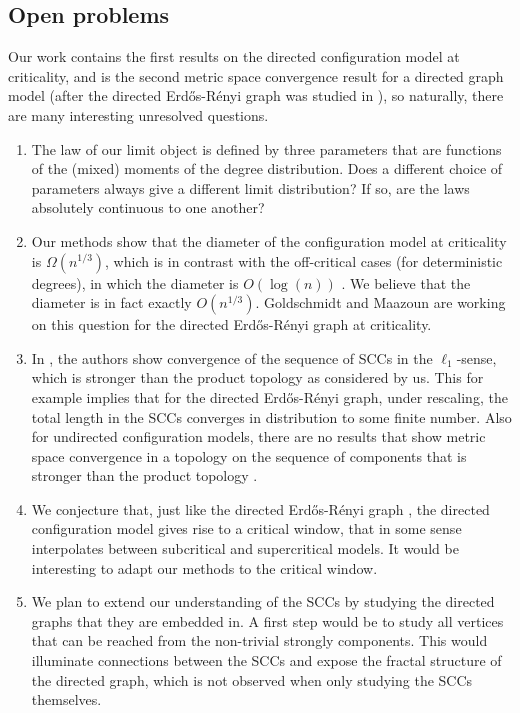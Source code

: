 \subsection{Open problems}\label{subsec.openproblems}
Our work contains the first results on the directed configuration model at criticality, and is the second metric space convergence result for a directed graph model (after the directed Erd\H{o}s-Rényi graph was studied in \cite{goldschmidtScalingLimitCritical2019}), so naturally, there are many interesting unresolved questions.
\begin{enumerate}
    \item The law of our limit object is defined by three parameters that are functions of the (mixed) moments of the degree distribution. Does a different choice of parameters always give a different limit distribution? If so, are the laws absolutely continuous to one another?
    \item Our methods show that the diameter of the configuration model at criticality is  $\Omega(n^{1/3})$, which is in contrast with the off-critical cases (for deterministic degrees), in which the diameter is $O(\log(n))$ \cite{caiDiameterDirectedConfiguration2020}. We believe that the diameter is in fact exactly $O(n^{1/3})$. Goldschmidt and Maazoun are working on this question for the directed Erd\H{o}s-Rényi graph at criticality. 
    \item In \cite{goldschmidtScalingLimitCritical2019}, the authors show convergence of the sequence of SCCs in the $\ell_1$-sense, which is stronger than the product topology as considered by us. This for example implies that for the directed Erd\H{o}s-Rényi graph, under rescaling, the total length in the SCCs converges in distribution to some finite number. Also for undirected configuration models, there are no results that show metric space convergence in a topology on the sequence of components that is stronger than the product topology \cite{Bhamidi2020,conchon--kerjanStableGraphMetric2020,Bhamidi2020Glmb}.
     \item We conjecture that, just like the directed Erd\H{o}s-Rényi graph \cite{goldschmidtScalingLimitCritical2019}, the directed configuration model gives rise to a critical window, that in some sense interpolates between subcritical and supercritical models. It would be interesting to adapt our methods to the critical window.
     \item We plan to extend our understanding of the SCCs by studying the directed graphs that they are embedded in. A first step would be to study all vertices that can be reached from the non-trivial strongly components. This would illuminate connections between the SCCs and expose the fractal structure of the directed graph, which is not observed when only studying the SCCs themselves.

\end{enumerate}
